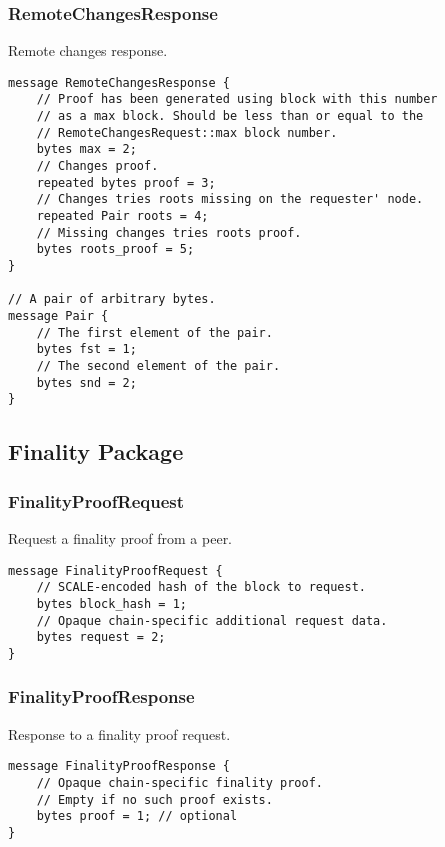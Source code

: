 \documentclass{book}
\begin{document}
\subsubsection{RemoteChangesResponse}

Remote changes response.

\begin{lstlisting}[frame=single]
message RemoteChangesResponse {
    // Proof has been generated using block with this number
    // as a max block. Should be less than or equal to the
    // RemoteChangesRequest::max block number.
    bytes max = 2;
    // Changes proof.
    repeated bytes proof = 3;
    // Changes tries roots missing on the requester' node.
    repeated Pair roots = 4;
    // Missing changes tries roots proof.
    bytes roots_proof = 5;
}

// A pair of arbitrary bytes.
message Pair {
    // The first element of the pair.
    bytes fst = 1;
    // The second element of the pair.
    bytes snd = 2;
}
\end{lstlisting}

\subsection{Finality Package}

\subsubsection{FinalityProofRequest}

Request a finality proof from a peer.

\begin{lstlisting}[frame=single]
message FinalityProofRequest {
    // SCALE-encoded hash of the block to request.
    bytes block_hash = 1;
    // Opaque chain-specific additional request data.
    bytes request = 2;
}
\end{lstlisting}

\subsubsection{FinalityProofResponse}

Response to a finality proof request.

\begin{lstlisting}[frame=single]
message FinalityProofResponse {
    // Opaque chain-specific finality proof.
    // Empty if no such proof exists.
    bytes proof = 1; // optional
}
\end{lstlisting}
\end{document}
